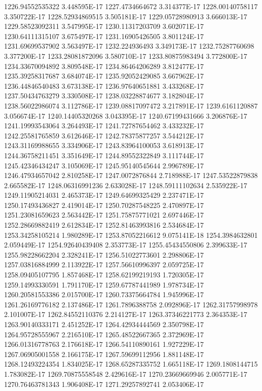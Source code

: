1226.94552535322  3.448595E-17
1227.4734664672  3.314377E-17
1228.00140758117  3.350722E-17
1228.52934869515  3.505181E-17
1229.05728980913  3.666013E-17
1229.58523092311  3.547995E-17
1230.11317203709  3.602071E-17
1230.64111315107  3.675497E-17
1231.16905426505  3.801124E-17
1231.69699537902  3.563497E-17
1232.224936493  3.349173E-17
1232.75287760698  3.377200E-17
1233.28081872096  3.580710E-17
1233.80875983494  3.772800E-17
1234.33670094892  3.809548E-17
1234.86464206289  3.812477E-17
1235.39258317687  3.684074E-17
1235.92052429085  3.667962E-17
1236.44846540483  3.673138E-17
1236.97640651881  3.433268E-17
1237.50434763279  3.330508E-17
1238.03228874677  3.182804E-17
1238.56022986074  3.112786E-17
1239.08817097472  3.217891E-17
1239.6161120887  3.056674E-17
1240.14405320268  3.043395E-17
1240.67199431666  3.206876E-17
1241.19993543064  3.264493E-17
1241.72787654462  3.433232E-17
1242.25581765859  3.612646E-17
1242.78375877257  3.544212E-17
1243.31169988655  3.334906E-17
1243.83964100053  3.618913E-17
1244.36758211451  3.351649E-17
1244.89552322849  3.111744E-17
1245.42346434247  3.105069E-17
1245.95140545644  2.996789E-17
1246.47934657042  2.810258E-17
1247.0072876844  2.718988E-17
1247.53522879838  2.665582E-17
1248.06316991236  2.633028E-17
1248.59111102634  2.535922E-17
1249.11905214031  2.465373E-17
1249.64699325429  2.237471E-17
1250.17493436827  2.419014E-17
1250.70287548225  2.470897E-17
1251.23081659623  2.563442E-17
1251.75875771021  2.697446E-17
1252.28669882419  2.612834E-17
1252.81463993816  2.534684E-17
1253.34258105214  1.980289E-17
1253.87052216612  9.075141E-18
1254.3984632801  2.059449E-17
1254.92640439408  2.353773E-17
1255.45434550806  2.399633E-17
1255.98228662204  2.328241E-17
1256.51022773601  2.298806E-17
1257.03816884999  2.113922E-17
1257.56610996397  2.059725E-17
1258.09405107795  1.857468E-17
1258.62199219193  1.720305E-17
1259.14993330591  1.791170E-17
1259.67787441989  1.978734E-17
1260.20581553386  2.015700E-17
1260.73375664784  1.945996E-17
1261.26169776182  2.137486E-17
1261.7896388758  2.092896E-17
1262.31757998978  2.101007E-17
1262.84552110376  2.214127E-17
1263.37346221773  2.364353E-17
1263.90140333171  2.451252E-17
1264.42934444569  2.350798E-17
1264.95728555967  2.216510E-17
1265.48522667365  2.372969E-17
1266.01316778763  2.176618E-17
1266.54110890161  1.927229E-17
1267.06905001558  2.166175E-17
1267.59699112956  1.881148E-17
1268.12493224354  1.834025E-17
1268.65287335752  1.665118E-17
1269.1808144715  1.783082E-17
1269.70875558548  2.429616E-17
1270.23669669946  2.005771E-17
1270.76463781343  1.906408E-17
1271.29257892741  2.053406E-17

